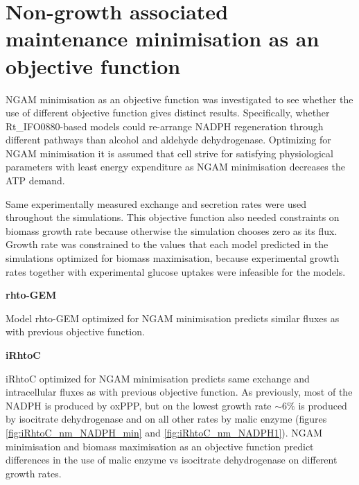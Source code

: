 \section{Non-growth associated maintenance minimisation as an objective function}

NGAM minimisation as an objective function was investigated to see whether the use of different objective function gives distinct results.
Specifically, whether Rt\_IFO0880-based models could re-arrange NADPH regeneration through different pathways than alcohol and aldehyde dehydrogenase. Optimizing for NGAM minimisation it is assumed that cell strive for satisfying physiological parameters with least energy expenditure as NGAM minimisation decreases the ATP demand.

Same experimentally measured exchange and secretion rates were used throughout the simulations. This objective function also needed constraints 
on biomass growth rate because otherwise the simulation chooses zero as its flux. 
Growth rate was constrained to the values that each model
predicted in the simulations optimized for biomass maximisation, because experimental growth rates together with experimental glucose 
uptakes were infeasible for the models. 

\textbf{rhto-GEM}

Model rhto-GEM optimized for NGAM minimisation predicts similar fluxes as with 
previous objective function. 

\textbf{iRhtoC}

iRhtoC optimized for NGAM minimisation predicts same exchange and intracellular fluxes as with 
previous objective function. 
As previously, most of the NADPH is produced by oxPPP, but on the lowest growth rate $\sim 6\%$ is produced by isocitrate dehydrogenase and on all other 
rates by malic enzyme (figures \ref{fig:iRhtoC_nm_NADPH_min} and \ref{fig:iRhtoC_nm_NADPH1}). NGAM minimisation and biomass maximisation as an objective 
function predict differences in the use of malic enzyme vs isocitrate dehydrogenase on different growth rates.

